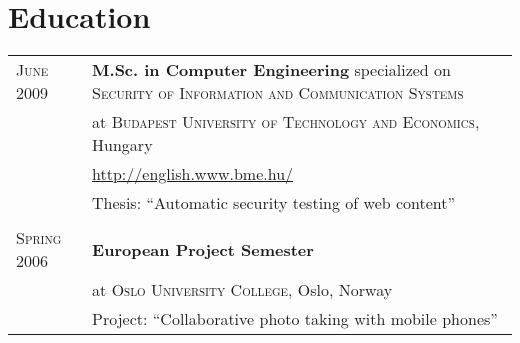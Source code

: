 \section{Education}
\begin{tabular}{p{2cm}|p{12.5cm}}   
 \textsc{June} 2009& \textbf{M.Sc. in Computer Engineering} specialized on \textsc{Security of Information and Communication Systems}\\
 & at \textsc{Budapest University of Technology and Economics}, Hungary\\
 & \url{http://english.www.bme.hu/}\\
 & Thesis: ``Automatic security testing of web content''\\
 
\multicolumn{2}{c}{} \\
\textsc{Spring} 2006 & \textbf{European Project Semester}\\
& at \textsc{Oslo University College}, Oslo, Norway\\ 
& Project: ``Collaborative photo taking with mobile phones''\\

\end{tabular}